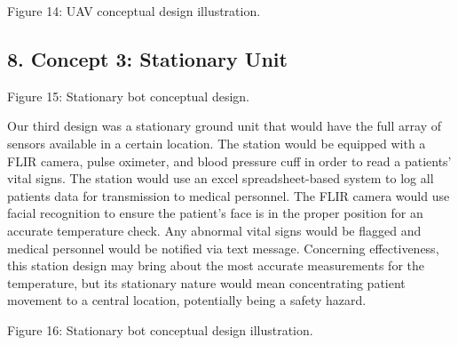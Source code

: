 ﻿\documentclass[10pt]{article}
\begin{document}
Figure 14: UAV conceptual design illustration.

\subsection{8. Concept 3:  Stationary Unit}
%	
%
%	
%
Figure 15: Stationary bot conceptual design.

        Our third design was a stationary ground unit that would have the full array of sensors available in a certain location. The station would be equipped with a FLIR camera, pulse oximeter, and blood pressure cuff in order to read a patients’ vital signs. The station would use an excel spreadsheet-based system to log all patients data for transmission to medical personnel. The FLIR camera would use facial recognition to ensure the patient’s face is in the proper position for an accurate temperature check. Any abnormal vital signs would be flagged and medical personnel would be notified via text message. Concerning effectiveness, this station design may bring about the most accurate measurements for the temperature, but its stationary nature would mean concentrating patient movement to a central location, potentially being a safety hazard. 
  
Figure 16: Stationary bot conceptual design illustration.
\end{document}
